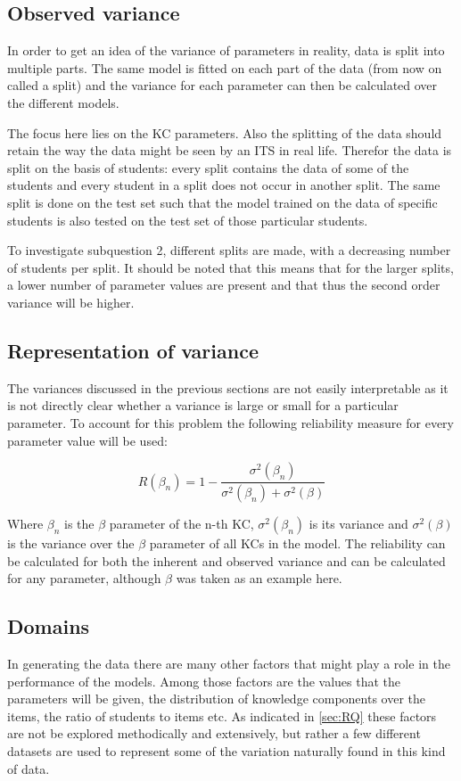 \documentclass{scrartcl}
\begin{document}
\subsection{Observed variance}

In order to get an idea of the variance of parameters in reality, data is split into multiple parts. The same model is fitted on each part of the data (from now on called a split) and the variance for each parameter can then be calculated over the different models. 

The focus here lies on the KC parameters. Also the splitting of the data should retain the way the data might be seen by an ITS in real life. Therefor the data is split on the basis of students: every split contains the data of some of the students and every student in a split does not occur in another split. The same split is done on the test set such that the model trained on the data of specific students is also tested on the test set of those particular students.

To investigate subquestion 2, different splits are made, with a decreasing number of students per split. It should be noted that this means that for the larger splits, a lower number of parameter values are present and that thus the second order variance will be higher.

\subsection{Representation of variance}
The variances discussed in the previous sections are not easily interpretable as it is not directly clear whether a variance is large or small for a particular parameter. To account for this problem the following reliability measure for every parameter value will be used:

\begin{equation}
\label{eq:reliability}
R(\beta_{n}) = 1-\frac{\sigma^{2}(\beta_n)}{\sigma^{2}(\beta_{n})+\sigma^{2}(\beta)}
\end{equation}

Where $\beta_{n}$ is the $\beta$ parameter of the n-th KC, $\sigma^{2}(\beta_{n})$ is its variance and $\sigma^{2}(\beta)$ is the variance over the $\beta$ parameter of all KCs in the model. The reliability can be calculated for both the inherent and observed variance and can be calculated for any parameter, although $\beta$ was taken as an example here.

\subsection{Domains}
\label{sec:domain}
In generating the data there are many other factors that might play a role in the performance of the models. Among those factors are the values that the parameters will be given, the distribution of knowledge components over the items, the ratio of students to items etc. As indicated in \ref{sec:RQ} these factors are not be explored methodically and extensively, but rather a few different datasets are used to represent some of the variation naturally found in this kind of data.
\end{document}
